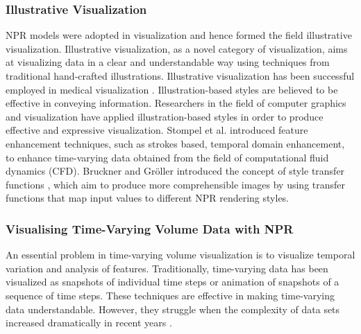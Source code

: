 \subsubsection{Illustrative Visualization}
NPR models were adopted in visualization and hence formed the field illustrative visualization.
Illustrative visualization, as a novel category of visualization, aims at visualizing data in a clear and understandable way using techniques from traditional hand-crafted illustrations. Illustrative visualization has been successful employed in medical visualization \cite{svakhine_illustration_2005} \cite{viola_importance-driven_2005}.
Illustration-based styles are believed to be effective in conveying information. Researchers in the field of computer graphics and visualization have applied illustration-based styles in order to produce effective and expressive visualization. Stompel et al. \cite{stompel_visualization_2002} introduced feature enhancement techniques, such as strokes based, temporal domain enhancement, to enhance time-varying data obtained from the field of computational fluid dynamics (CFD).
Bruckner and Gr{\"o}ller introduced the concept of style transfer functions \cite{bruckner_style_2007}, which aim to produce more comprehensible images by using transfer functions that map input values to different NPR rendering styles.

\subsubsection{Visualising Time-Varying Volume Data with NPR}
An essential problem in time-varying volume visualization is to visualize temporal variation and analysis of features. Traditionally, time-varying data has been visualized as snapshots of individual time steps or animation of snapshots of a sequence of time steps. These techniques are effective in making time-varying data understandable. However, they struggle when the complexity of data sets increased dramatically in recent years \cite{brambilla_illustrative_2012}.


